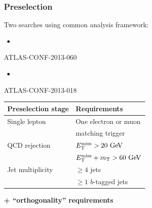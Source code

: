 \begin{frame}\frametitle{Preselection}
\centering\myskip

\begin{minipage}{.6\textwidth}\centering\footnotesize
Two searches using common analysis framework:
\begin{minipage}{.5\textwidth}\centering
\begin{itemize}
\item \wbx
\end{itemize}
\scriptsize
\cccolor 

ATLAS-CONF-2013-060~\cite{ATLAS-CONF-2013-060}
\end{minipage}\begin{minipage}{.5\textwidth}\centering
\begin{itemize}
\item \htx
\end{itemize}
\scriptsize
\cccolor 

ATLAS-CONF-2013-018~\cite{ATLAS-CONF-2013-018}
\end{minipage}

\myskip

\begin{tabular}{ll}
\toprule
Preselection stage & Requirements \\
\midrule
Single lepton & One electron or muon\\
              & matching trigger  \\\midrule
QCD rejection & $\met >20\gev$\\
              & $\met +m_{\rm T}>60\gev$ \\\midrule
Jet multiplicity & $\geq 4$ jets\\
                 & $\geq 1$ $b$-tagged jets \\
\bottomrule\end{tabular}

\myskip
{\bfseries\cccolor + ``orthogonality'' requirements} 

\myskip


\end{minipage}
\end{frame}
